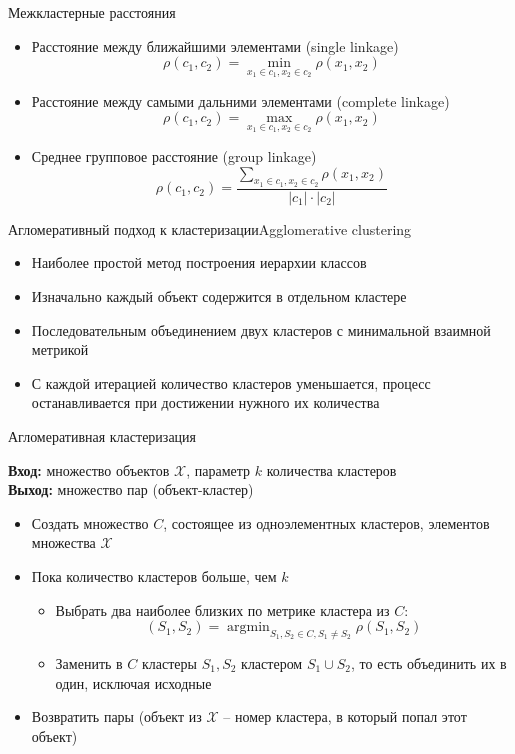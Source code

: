 \documentclass[compress,unicode]{beamer}
\begin{document}
\begin{frame}{Межкластерные расстояния}
\begin{itemize}
	\item Расстояние между ближайшими элементами (single linkage)
$$
\rho (c_1,c_2) = \min_{x_1\in c_1, x_2 \in c_2}  \rho(x_1,x_2)
$$
	\item Расстояние между самыми дальними элементами (complete linkage)
$$
\rho (c_1,c_2) = \max_{x_1\in c_1, x_2 \in c_2}  \rho(x_1,x_2)
$$
	\item Среднее групповое расстояние (group linkage)
$$
\rho (c_1,c_2) = \frac{\sum_{x_1\in c_1, x_2 \in c_2}  \rho(x_1,x_2)}{|c_1| \cdot |c_2|}
$$
\end{itemize}
\end{frame}


\begin{frame}{Агломеративный подход к кластеризации}{Agglomerative clustering}
\begin{itemize}
	\item Наиболее простой метод построения иерархии классов
	\item Изначально каждый объект содержится в отдельном кластере
	\item Последовательным объединением двух кластеров с минимальной взаимной метрикой
	\item С каждой итерацией количество кластеров уменьшается, процесс останавливается при достижении нужного их количества
\end{itemize}
\end{frame}

\begin{frame}{Агломеративная кластеризация}
\begin{block}{}
\small
{\bf\color{main}Вход:} множество объектов $\mathcal{X}$, параметр $k$ количества кластеров\\
{\bf\color{main}Выход:} множество пар (объект-кластер) \\
\begin{itemize}
	\item Создать множество $C$, состоящее из одноэлементных кластеров, элементов множества $\mathcal{X}$
	\item Пока количество кластеров больше, чем $k$
	\begin{itemize}
		\item Выбрать два наиболее близких по метрике кластера из $C$:
		$$
		(S_1,S_2) = \mathop{\arg \min}_{S_1,S_2 \in C, S_1 \ne S_2} \rho(S_1,S_2)
		$$
		\item Заменить в $C$ кластеры $S_1,S_2$ кластером $S_1 \cup S_2$, то есть объединить их в один, исключая исходные
	\end{itemize}
	\item Возвратить пары (объект из $\mathcal{X}$ -- номер кластера, в который попал этот объект)
\end{itemize}
\end{block}
\end{frame}
\end{document}
